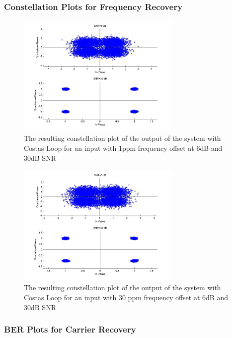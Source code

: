 \documentclass[]{article}
\begin{document}
\subsubsection{Constellation Plots  for Frequency Recovery}
\begin{figure}[H]
\centering
\hspace*{-2cm}\includegraphics[width=0.7\textwidth]{qpConstfo_costas1.jpg}
\caption{The resulting constellation plot of the output of the system with Costas Loop for an input with 1ppm frequency offset at 6dB and 30dB SNR }
\end{figure}

\begin{figure}[H]
\centering
\hspace*{-2cm}\includegraphics[width=0.7\textwidth]{qpConstfo_costas2.jpg}
\caption{The resulting constellation plot of the output of the system with Costas Loop for an input with 30 ppm frequency offset at 6dB and 30dB SNR }
\end{figure}


\subsubsection{BER Plots for Carrier Recovery}
\end{document}
